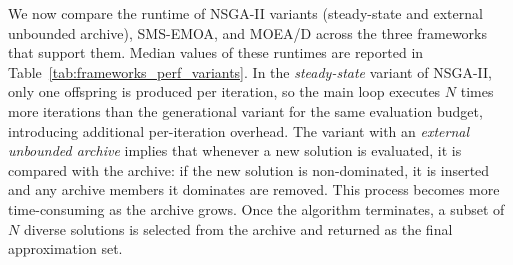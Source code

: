 \documentclass[journal]{IEEEtran}
\newcommand{\VAMOS}{VAMOS}
\begin{document}



We now compare the runtime of NSGA-II variants (steady-state and external unbounded archive), SMS-EMOA, and MOEA/D across the three frameworks that support them. Median values of these runtimes are reported in Table~\ref{tab:frameworks_perf_variants}. In the \textit{steady-state} variant of NSGA-II, only one offspring is produced per iteration, so the main loop executes $N$ times more iterations than the generational variant for the same evaluation budget, introducing additional per-iteration overhead. The variant with an \textit{external unbounded archive} implies that whenever a new solution is evaluated, it is compared with the archive: if the new solution is non-dominated, it is inserted and any archive members it dominates are removed. This process becomes more time-consuming as the archive grows. Once the algorithm terminates, a subset of $N$ diverse solutions is selected from the archive and returned as the final approximation set.
\end{document}
